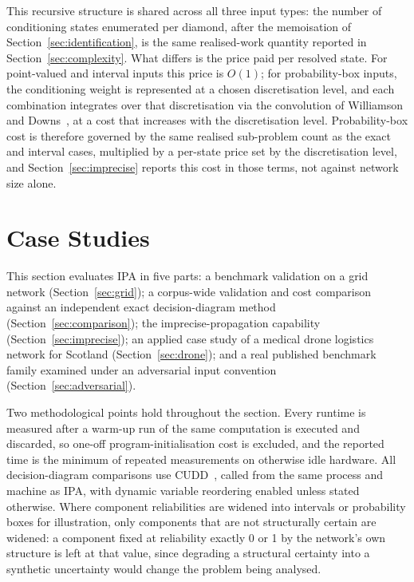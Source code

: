 \documentclass[preprint,12pt]{elsarticle}
\begin{document}
This recursive structure is shared across all three input types: the number of conditioning states enumerated per diamond, after the memoisation of Section~\ref{sec:identification}, is the same realised-work quantity reported in Section~\ref{sec:complexity}. What differs is the price paid per resolved state. For point-valued and interval inputs this price is $O(1)$; for probability-box inputs, the conditioning weight is represented at a chosen discretisation level, and each combination integrates over that discretisation via the convolution of Williamson and Downs~\cite{williamson_probabilistic_1990}, at a cost that increases with the discretisation level. Probability-box cost is therefore governed by the same realised sub-problem count as the exact and interval cases, multiplied by a per-state price set by the discretisation level, and Section~\ref{sec:imprecise} reports this cost in those terms, not against network size alone.



\clearpage  %
\section{Case Studies}\label{sec:cases}

This section evaluates IPA in five parts: a benchmark validation on a grid network (Section~\ref{sec:grid}); a corpus-wide validation and cost comparison against an independent exact decision-diagram method (Section~\ref{sec:comparison}); the imprecise-propagation capability (Section~\ref{sec:imprecise}); an applied case study of a medical drone logistics network for Scotland (Section~\ref{sec:drone}); and a real published benchmark family examined under an adversarial input convention (Section~\ref{sec:adversarial}).

Two methodological points hold throughout the section. Every runtime is measured after a warm-up run of the same computation is executed and discarded, so one-off program-initialisation cost is excluded, and the reported time is the minimum of repeated measurements on otherwise idle hardware. All decision-diagram comparisons use CUDD~\cite{somenzi_cudd}, called from the same process and machine as IPA, with dynamic variable reordering enabled unless stated otherwise. Where component reliabilities are widened into intervals or probability boxes for illustration, only components that are not structurally certain are widened: a component fixed at reliability exactly 0 or 1 by the network's own structure is left at that value, since degrading a structural certainty into a synthetic uncertainty would change the problem being analysed.
\end{document}
